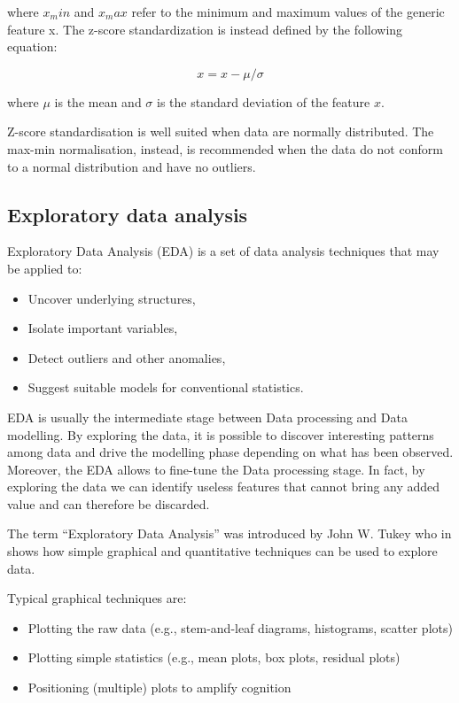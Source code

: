 where $x_min$ and $x_max$ refer to the minimum and maximum values of the generic feature x. The z-score standardization is instead defined by the following equation:

\begin{equation}
    x = x - \mu / \sigma
\end{equation}

where $\mu$ is the mean and $\sigma$ is the standard deviation of the feature $x$.

Z-score standardisation is well suited when data are normally distributed.
The max-min normalisation, instead, is recommended when the data do not conform to a normal distribution and have no outliers. 


\subsection{Exploratory data analysis} \label{Exploratory Data Analysis}

Exploratory Data Analysis (EDA) is a set of data analysis techniques that may be applied to:

\begin{itemize}
    \item Uncover underlying structures,
    \item Isolate important variables,
    \item Detect outliers and other anomalies,
    \item Suggest suitable models for conventional statistics.
\end{itemize}

EDA is usually the intermediate stage between Data processing and Data modelling. By exploring the data, it is possible to discover interesting patterns among data and drive the modelling phase depending on what has been observed. Moreover, the EDA allows to fine-tune the Data processing stage. In fact, by exploring the data we can identify useless features that cannot bring any added value and can therefore be discarded.   

The term “Exploratory Data Analysis” was introduced by John W. Tukey who in \citep{tukey1977exploratory} shows how simple graphical and quantitative techniques can be used to explore data.

Typical graphical techniques are:

\begin{itemize}
    \item Plotting the raw data (e.g., stem-and-leaf diagrams, histograms, scatter plots)
    \item Plotting simple statistics (e.g., mean plots, box plots, residual plots)
    \item Positioning (multiple) plots to amplify cognition
\end{itemize}


